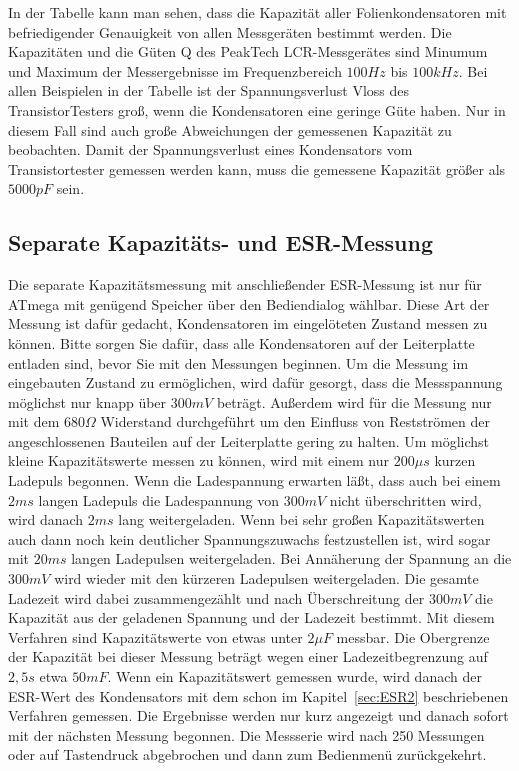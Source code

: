 \vspace{0.5 cm}

In der Tabelle kann man sehen, dass die Kapazität aller Folienkondensatoren mit befriedigender Genauigkeit von allen
Messgeräten bestimmt werden. Die Kapazitäten und die Güten Q des PeakTech LCR-Messgerätes sind Minumum
und Maximum der Messergebnisse im Frequenzbereich \(100Hz\) bis \(100kHz\).
Bei allen Beispielen in der Tabelle ist der Spannungsverlust Vloss des TransistorTesters groß,
wenn die Kondensatoren eine geringe Güte haben. Nur in diesem Fall sind auch große Abweichungen
der gemessenen Kapazität zu beobachten. Damit der Spannungsverlust eines Kondensators vom
Transistortester gemessen werden kann, muss die gemessene Kapazität größer als \(5000pF\) sein.

\subsection{Separate Kapazitäts- und ESR-Messung}
Die separate Kapazitätsmessung mit anschließender ESR-Messung ist nur für ATmega mit genügend Speicher
über den Bediendialog wählbar. Diese Art der Messung ist dafür gedacht, Kondensatoren im eingelöteten
Zustand messen zu können. 
Bitte sorgen Sie dafür, dass alle Kondensatoren auf der Leiterplatte entladen sind, bevor Sie mit den
Messungen beginnen.
Um die Messung im eingebauten Zustand zu ermöglichen, wird dafür gesorgt,
dass die Messspannung möglichst nur knapp über \(300mV\) beträgt.
Außerdem wird für die Messung nur mit dem \(680\Omega\) Widerstand durchgeführt um den Einfluss von
Restströmen der angeschlossenen Bauteilen auf der Leiterplatte gering zu halten.
Um möglichst kleine Kapazitätswerte messen zu können, wird mit einem nur \(200\mu s\) kurzen Ladepuls
begonnen. Wenn die Ladespannung erwarten läßt, dass auch bei einem \(2ms\) langen Ladepuls die Ladespannung
von \(300mV\) nicht überschritten wird, wird danach \(2ms\) lang weitergeladen. Wenn bei sehr großen
Kapazitätswerten auch dann noch kein deutlicher Spannungszuwachs festzustellen ist, wird sogar mit
\(20ms\) langen Ladepulsen weitergeladen. Bei Annäherung der Spannung an die \(300mV\) wird wieder
mit den kürzeren Ladepulsen weitergeladen. Die gesamte Ladezeit wird dabei zusammengezählt und nach
Überschreitung der \(300mV\) die Kapazität aus der geladenen Spannung und der Ladezeit bestimmt.
Mit diesem Verfahren sind Kapazitätswerte von etwas unter \(2\mu F\) messbar. Die Obergrenze der Kapazität
bei dieser Messung beträgt wegen einer Ladezeitbegrenzung auf \(2,5s\) etwa \(50mF\).
Wenn ein Kapazitätswert gemessen wurde, wird danach der ESR-Wert des Kondensators mit dem schon
im Kapitel~\ref{sec:ESR2} beschriebenen Verfahren gemessen.
Die Ergebnisse werden nur kurz angezeigt und danach sofort mit der nächsten Messung begonnen.
Die Messserie wird nach 250 Messungen oder auf Tastendruck abgebrochen und dann zum Bedienmenü zurückgekehrt.

